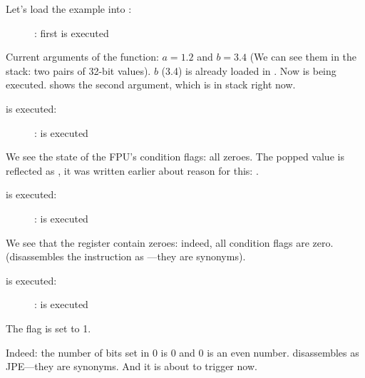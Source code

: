 ﻿\clearpage
{}
\myindex{\olly}

Let's load the example into \olly:

\begin{figure}[H]
\centering
{}
\caption{\olly: first \FLD is executed}
\label{fig:FPU_comparison_case1_olly1}
\end{figure}

Current arguments of the function: $a=1.2$ and $b=3.4$ (We can see them in the stack: two pairs of 32-bit values).
$b$ (3.4) is already loaded in .
Now \FCOMP is being executed. 
\olly shows the second \FCOMP argument, which is in stack right now.

\clearpage
\FCOMP is executed:

\begin{figure}[H]
\centering
{}
\caption{\olly: \FCOMP is executed}
\label{fig:FPU_comparison_case1_olly2}
\end{figure}

We see the state of the \ac{FPU}'s condition flags: all zeroes.
The popped value is reflected as , it was written earlier about reason for this: 
.

\clearpage
\FNSTSW is executed:
\begin{figure}[H]
\centering
{}
\caption{\olly: \FNSTSW is executed}
\label{fig:FPU_comparison_case1_olly3}
\end{figure}

We see that the  register contain zeroes: indeed, all condition flags are zero.
(\olly disassembles the \FNSTSW instruction as ---they are synonyms).

\clearpage
\TEST is executed:

\begin{figure}[H]
\centering
{}
\caption{\olly: \TEST is executed}
\label{fig:FPU_comparison_case1_olly4}
\end{figure}

The  flag is set to 1.

Indeed: the number of bits set in 0 is 0 and 0 is an even number.
\olly disassembles  as \ac{JPE}---they are synonyms.
And it is about to trigger now.

